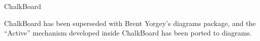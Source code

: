 \begin{hcarentry}{ChalkBoard}
\label{chalkboard}
\makeheader

ChalkBoard has been superseded with Brent Yorgey's diagrams package,
and the ``Active'' mechanism developed inside ChalkBoard has been ported to diagrams.

\end{hcarentry}
